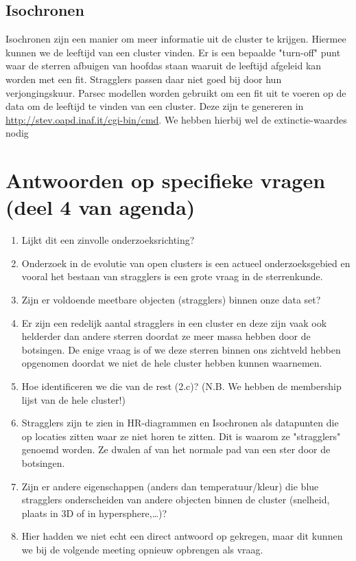 \documentclass[11pt,a4paper]{article}
\begin{document}
\subsection{Isochronen}
Isochronen zijn een manier om meer informatie uit de cluster te krijgen. Hiermee kunnen we de leeftijd van een cluster vinden. Er is een bepaalde "turn-off" punt waar de sterren afbuigen van hoofdas staan waaruit de leeftijd afgeleid kan worden met een fit. Stragglers passen daar niet goed bij door hun verjongingskuur. Parsec modellen worden gebruikt om een fit uit te voeren op de data om de leeftijd te vinden van een cluster. Deze zijn te genereren in \url{http://stev.oapd.inaf.it/cgi-bin/cmd}. We hebben hierbij wel de extinctie-waardes nodig
\pagebreak

\section{Antwoorden op specifieke vragen (deel 4 van agenda)}
\begin{enumerate}
\item	Lijkt dit een zinvolle onderzoeksrichting?
\item[] Onderzoek in de evolutie van open clusters is een actueel onderzoeksgebied en vooral het bestaan van stragglers is een grote vraag in de sterrenkunde.
\item	Zijn er voldoende meetbare objecten (stragglers) binnen onze data set?
\item[] Er zijn een redelijk aantal stragglers in een cluster en deze zijn vaak ook helderder dan andere sterren doordat ze meer massa hebben door de botsingen. De enige vraag is of we deze sterren binnen ons zichtveld hebben opgenomen doordat we niet de hele cluster hebben kunnen waarnemen.
\item	Hoe identificeren we die van de rest (2.c)? (N.B. We hebben de membership lijst van de hele cluster!)
\item[] Stragglers zijn te zien in HR-diagrammen en Isochronen als datapunten die op locaties zitten waar ze niet horen te zitten. Dit is waarom ze "stragglers" genoemd worden. Ze dwalen af van het normale pad van een ster door de botsingen. 
\item	Zijn er andere eigenschappen (anders dan temperatuur/kleur) die blue stragglers onderscheiden van andere objecten binnen de cluster (snelheid, plaats in 3D of in hypersphere,…)?
\item[] Hier hadden we niet echt een direct antwoord op gekregen, maar dit kunnen we bij de volgende meeting opnieuw opbrengen als vraag.
\end{enumerate}
\end{document}
